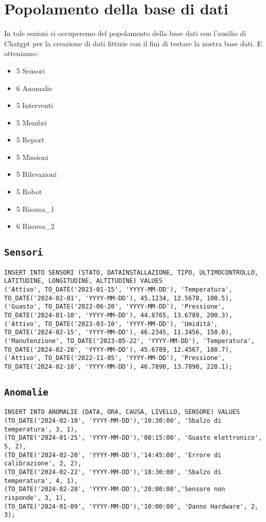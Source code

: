 \section{Popolamento della base di dati}
In tale sezioni ci occuperemo del popolamento della base dati con l'ausilio di Chatgpt per la creazione di dati fittizie con il fini di testare la nostra base dati. E otteniamo:
\begin{itemize}
\item 5 Sensori
\item 6 Anomalie
\item 5 Interventi
\item 5 Membri
\item 5 Report
\item 5 Missioni
\item 5 Rilevazioni
\item 5 Robot
\item 5 Risorsa\_1
\item 6 Risorsa\_2
\end{itemize}
\subsection{\texttt{Sensori}}
\begin{verbatim}
INSERT INTO SENSORI (STATO, DATAINSTALLAZIONE, TIPO, ULTIMOCONTROLLO, LATITUDINE, LONGITUDINE, ALTITUDINE) VALUES
('Attivo', TO_DATE('2023-01-15', 'YYYY-MM-DD'), 'Temperatura', TO_DATE('2024-02-01', 'YYYY-MM-DD'), 45.1234, 12.5678, 100.5),
('Guasto', TO_DATE('2022-06-20', 'YYYY-MM-DD'), 'Pressione', TO_DATE('2024-01-10', 'YYYY-MM-DD'), 44.8765, 13.6789, 200.3),
('Attivo', TO_DATE('2023-03-10', 'YYYY-MM-DD'), 'Umidità', TO_DATE('2024-02-15', 'YYYY-MM-DD'), 46.2345, 11.3456, 150.0),
('Manutenzione', TO_DATE('2023-05-22', 'YYYY-MM-DD'), 'Temperatura', TO_DATE('2024-02-28', 'YYYY-MM-DD'), 45.6789, 12.4567, 180.7),
('Attivo', TO_DATE('2022-11-05', 'YYYY-MM-DD'), 'Pressione', TO_DATE('2024-02-10', 'YYYY-MM-DD'), 46.7890, 13.7890, 220.1);
\end{verbatim}
\subsection{\texttt{Anomalie}}
\begin{verbatim}
INSERT INTO ANOMALIE (DATA, ORA, CAUSA, LIVELLO, SENSORE) VALUES 
(TO_DATE('2024-02-10', 'YYYY-MM-DD'),'10:30:00', 'Sbalzo di temperatura', 3, 1),
(TO_DATE('2024-01-25', 'YYYY-MM-DD'),'08:15:00', 'Guasto elettronico', 5, 2),
(TO_DATE('2024-02-20', 'YYYY-MM-DD'),'14:45:00', 'Errore di calibrazione', 2, 2),
(TO_DATE('2024-02-22', 'YYYY-MM-DD'),'18:30:00', 'Sbalzo di temperatura', 4, 1),
(TO_DATE('2024-02-28', 'YYYY-MM-DD'),'20:00:00','Sensore non risponde', 3, 1),
(TO_DATE('2024-01-09', 'YYYY-MM-DD'),'10:00:00', 'Danno Hardware', 2, 3);
\end{verbatim}

